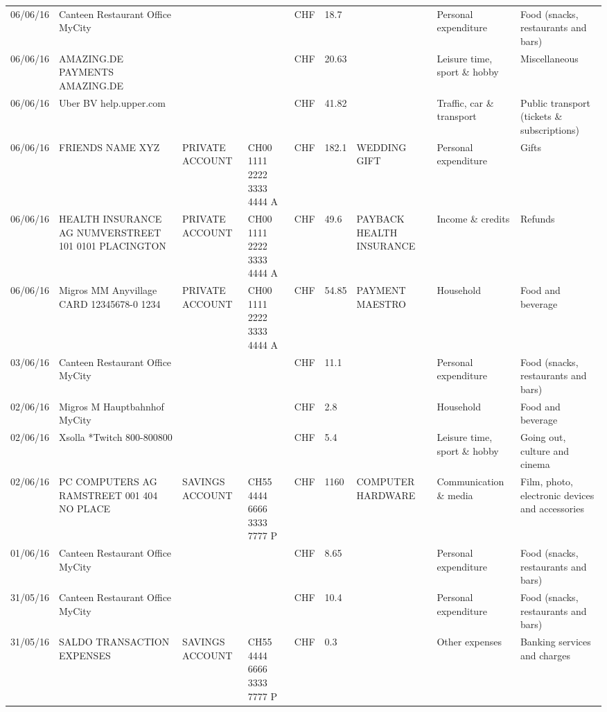 \begin{landscape}
\begin{center}
\begin{longtable}{lllllllll}
		06/06/16 & Canteen Restaurant Office      MyCity &       &       & CHF   & 18.7  &       & Personal expenditure & Food (snacks, restaurants and bars) \\
		06/06/16 & AMAZING.DE PAYMENTS       AMAZING.DE &       &       & CHF   & 20.63 &       & Leisure time, sport \& hobby & Miscellaneous \\
		06/06/16 & Uber BV                  help.upper.com &       &       & CHF   & 41.82 &       & Traffic, car \& transport & Public transport (tickets \& subscriptions) \\
		06/06/16 & FRIENDS NAME XYZ & PRIVATE ACCOUNT & CH00 1111 2222 3333 4444 A & CHF   & 182.1 & WEDDING GIFT & Personal expenditure & Gifts \\
		06/06/16 & HEALTH INSURANCE AG NUMVERSTREET 101 0101 PLACINGTON & PRIVATE ACCOUNT & CH00 1111 2222 3333 4444 A & CHF   & 49.6  & PAYBACK HEALTH INSURANCE & Income \& credits & Refunds \\
		06/06/16 & Migros MM Anyvillage CARD 12345678-0 1234 & PRIVATE ACCOUNT & CH00 1111 2222 3333 4444 A & CHF   & 54.85 & PAYMENT MAESTRO & Household & Food and beverage \\
		03/06/16 & Canteen Restaurant Office      MyCity &       &       & CHF   & 11.1  &       & Personal expenditure & Food (snacks, restaurants and bars) \\
		02/06/16 & Migros M Hauptbahnhof    MyCity &       &       & CHF   & 2.8   &       & Household & Food and beverage \\
		02/06/16 & Xsolla *Twitch           800-800800 &       &       & CHF   & 5.4   &       & Leisure time, sport \& hobby & Going out, culture and cinema \\
		02/06/16 & PC COMPUTERS AG RAMSTREET 001 404 NO PLACE & SAVINGS ACCOUNT & CH55 4444 6666 3333 7777 P & CHF   & 1160  & COMPUTER HARDWARE & Communication \& media & Film, photo, electronic devices and accessories \\
		01/06/16 & Canteen Restaurant Office      MyCity &       &       & CHF   & 8.65  &       & Personal expenditure & Food (snacks, restaurants and bars) \\
		31/05/16 & Canteen Restaurant Office      MyCity &       &       & CHF   & 10.4  &       & Personal expenditure & Food (snacks, restaurants and bars) \\
		31/05/16 & SALDO TRANSACTION EXPENSES & SAVINGS ACCOUNT & CH55 4444 6666 3333 7777 P & CHF   & 0.3   &       & Other expenses & Banking services and charges \\

\end{longtable}
\end{center}
\end{landscape}
